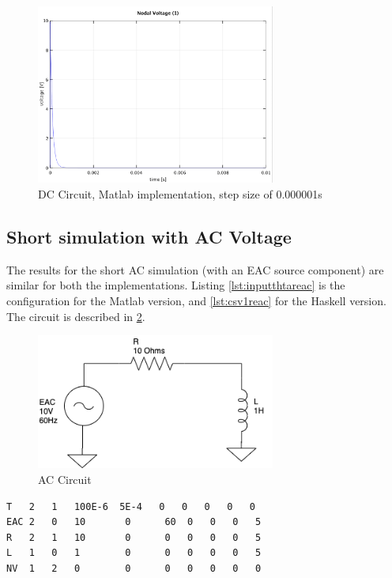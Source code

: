 \begin{figure}[H]
   \centering
   \includegraphics[width=0.7\textwidth]{img/dcresultsmicrooctave.png}
   \caption{DC Circuit, Matlab implementation, step size of 0.000001s}
   \label{fig:dcresultsmicrooctave}
\end{figure}


\subsection{Short simulation with AC Voltage}

The results for the short AC simulation (with an EAC source component) are similar for both the implementations. Listing \ref{lst:inputthtareac} is the configuration for the Matlab version, and \cref{lst:csv1reac} for the Haskell version. The circuit is described in \cref{eacresults2}.

\begin{figure}[H]
   \centering
   \includegraphics[width=0.7\textwidth]{img/eacresults2.png}
   \caption{AC Circuit}
   \label{eacresults2}
\end{figure}


\begin{lstlisting}[language=bash, caption={Original input data file for ETR-P Matlab}, captionpos=b, label={lst:inputthtareac}]
T   2   1   100E-6  5E-4   0   0   0   0   0
EAC 2   0   10       0      60  0   0   0   5
R   2   1   10       0      0   0   0   0   5
L   1   0   1        0      0   0   0   0   5
NV  1   2   0        0      0   0   0   0   0
\end{lstlisting}

